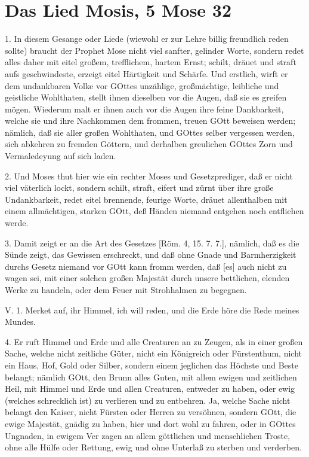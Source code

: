 \section{Das Lied Mosis, 5 Mose 32}

1. In diesem Gesange oder Liede (wiewohl er zur Lehre billig freundlich reden sollte) braucht der Prophet Mose nicht viel sanfter, gelinder Worte, sondern redet alles daher mit eitel großem, trefflichem, hartem Ernst; schilt, dräuet und straft aufs geschwindeste, erzeigt eitel Härtigkeit und Schärfe. Und erstlich, wirft er dem undankbaren Volke vor GOttes unzählige, großmächtige, leibliche und geistliche Wohlthaten, stellt ihnen dieselben vor die Augen, daß sie es greifen mögen. Wiederum malt er ihnen auch vor die Augen ihre feine Dankbarkeit, welche sie und ihre Nachkommen dem frommen, treuen GOtt beweisen werden; nämlich, daß sie aller großen Wohlthaten, und GOttes selber vergessen werden, sich abkehren zu fremden Göttern, und derhalben greulichen GOttes Zorn und Vermaledeyung auf sich laden.

2. Und Moses thut hier wie ein rechter Moses und Gesetzprediger, daß er nicht viel väterlich lockt, sondern schilt, straft, eifert und zürnt über ihre große Undankbarkeit, redet eitel brennende, feurige Worte, dräuet allenthalben mit einem allmächtigen, starken GOtt, deß Händen niemand entgehen noch entfliehen werde.

3. Damit zeigt er an die Art des Gesetzes [Röm. 4, 15. 7. 7.], nämlich, daß es die Sünde zeigt, das Gewissen erschreckt, und daß ohne Gnade und Barmherzigkeit durchs Gesetz niemand vor GOtt kann fromm werden, daß [es] auch nicht zu wagen sei, mit einer solchen großen Majestät durch unsere bettlichen, elenden Werke zu handeln, oder dem Feuer mit Strohhalmen zu begegnen.

\begin{schriftzitat}
V. 1. Merket auf, ihr Himmel, ich will reden, und die Erde höre die Rede meines Mundes.
\end{schriftzitat}

4. Er ruft Himmel und Erde und alle Creaturen an zu Zeugen, als in einer großen Sache, welche nicht zeitliche Güter, nicht ein Königreich oder Fürstenthum, nicht ein Haus, Hof, Gold oder Silber, sondern einem jeglichen das Höchste und Beste belangt; nämlich GOtt, den Brunn alles Guten, mit allem ewigen und zeitlichen Heil, mit Himmel und Erde und allen Creaturen, entweder zu haben, oder ewig (welches schrecklich ist) zu verlieren und zu entbehren. Ja, welche Sache nicht belangt den Kaiser, nicht Fürsten oder Herren zu versöhnen, sondern GOtt, die ewige Majestät, gnädig zu haben, hier und dort wohl zu fahren, oder in GOttes Ungnaden, in ewigem Ver zagen an allem göttlichen und menschlichen Troste, ohne alle Hülfe oder Rettung, ewig und ohne Unterlaß zu sterben und verderben.

